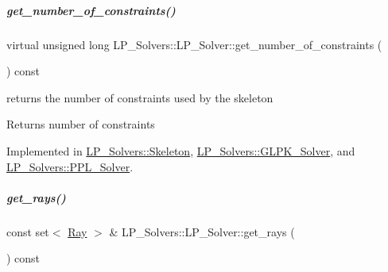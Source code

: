 \mbox{\label{group___c_l_s_solvers_a1a220bc10c6d8696dd5885d7f3678e5f}} 
\subparagraph{\texorpdfstring{get\+\_\+number\+\_\+of\+\_\+constraints()}{get\_number\_of\_constraints()}}
{\footnotesize\ttfamily virtual unsigned long L\+P\+\_\+\+Solvers\+::\+L\+P\+\_\+\+Solver\+::get\+\_\+number\+\_\+of\+\_\+constraints (\begin{DoxyParamCaption}{ }\end{DoxyParamCaption}) const\hspace{0.3cm}{\ttfamily [pure virtual]}}



returns the number of constraints used by the skeleton 

\begin{DoxyReturn}{Returns}
number of constraints 
\end{DoxyReturn}


Implemented in \hyperlink{group___c_l_s_solvers_ac13c3eb80cc3a4fdee872c4c976da489}{L\+P\+\_\+\+Solvers\+::\+Skeleton}, \hyperlink{group___c_l_s_solvers_af28eb491140e583b453773ead208ae32}{L\+P\+\_\+\+Solvers\+::\+G\+L\+P\+K\+\_\+\+Solver}, and \hyperlink{group___c_l_s_solvers_afb7f014f84eb37026fe26f8c3114c0f0}{L\+P\+\_\+\+Solvers\+::\+P\+P\+L\+\_\+\+Solver}.

\mbox{\label{group___c_l_s_solvers_a8328f67af66c81db467a6366f48ba3c8}} 
\subparagraph{\texorpdfstring{get\+\_\+rays()}{get\_rays()}}
{\footnotesize\ttfamily const set$<$ \hyperlink{group___c_l_s_solvers_class_l_p___solvers_1_1_ray}{Ray} $>$ \& L\+P\+\_\+\+Solvers\+::\+L\+P\+\_\+\+Solver\+::get\+\_\+rays (\begin{DoxyParamCaption}{ }\end{DoxyParamCaption}) const\hspace{0.3cm}{\ttfamily [virtual]}}



